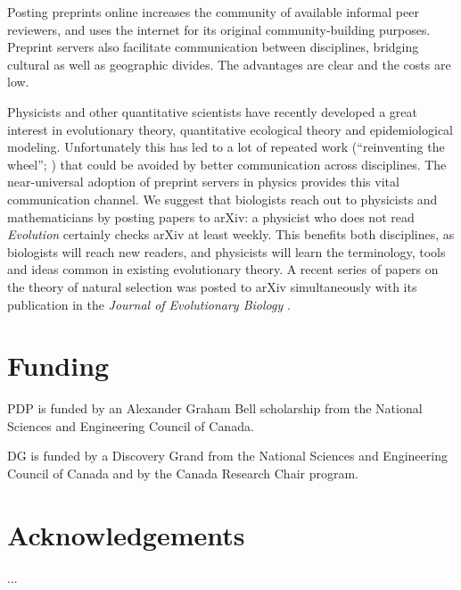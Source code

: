 \documentclass[letterpaper,twocolumn,superscriptaddress,showkeys]{revtex4-1}
\begin{document}
Posting preprints online increases the community of available informal peer
reviewers, and uses the internet for its original community-building purposes.
Preprint servers also facilitate communication between disciplines, bridging
cultural as well as geographic divides. The advantages are clear and the costs
are low.

Physicists and other quantitative scientists have recently developed a great
interest in evolutionary theory, quantitative ecological theory and
epidemiological modeling.  Unfortunately this has led to a lot of repeated work
(``reinventing the wheel''; \cite{de2011contribution}) that could be avoided by
better communication across disciplines.  The near-universal adoption of
preprint servers in physics provides this vital communication channel.  We
suggest that biologists reach out to physicists and mathematicians by posting
papers to arXiv: a physicist who does not read \emph{Evolution} certainly checks
arXiv at least weekly.  This benefits both disciplines, as biologists will reach
new readers, and physicists will learn the terminology, tools and ideas common
in existing evolutionary theory.  A recent series of papers on the theory of
natural selection was posted to arXiv simultaneously with its publication in the
\emph{Journal of Evolutionary Biology}
\cite{JEB:JEB2431,JEB:JEB2498,JEB:JEB2378,JEB:JEB2373}.

\section{Funding}

PDP is funded by an Alexander Graham Bell scholarship from the National Sciences
and Engineering Council of Canada.

DG is funded by a Discovery Grand from the National Sciences and Engineering
Council of Canada and by the Canada Research Chair program.

\section{Acknowledgements}

...

\newpage


\end{document}
